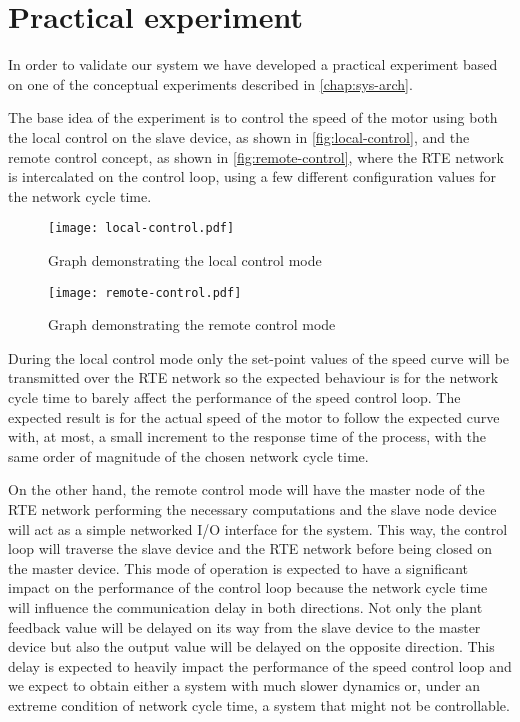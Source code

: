\section{Practical experiment}
In order to validate our system we have developed a practical experiment based on one of the conceptual experiments described in \autoref{chap:sys-arch}.

The base idea of the experiment is to control the speed of the motor using both the local control on the slave device, as shown in \autoref{fig:local-control}, and the remote control concept, as shown in \autoref{fig:remote-control}, where the RTE network is intercalated on the control loop, using a few different configuration values for the network cycle time.

\begin{figure}[htp]
	\centering
	\texttt{[image: local-control.pdf]}
	\caption{Graph demonstrating the local control mode}
	\label{fig:local-control}
\end{figure}

\begin{figure}[htp]
	\centering
	\texttt{[image: remote-control.pdf]}
	\caption{Graph demonstrating the remote control mode}
	\label{fig:remote-control}
\end{figure}

During the local control mode only the set-point values of the speed curve will be transmitted over the RTE network so the expected behaviour is for the network cycle time to barely affect the performance of the speed control loop.
The expected result is for the actual speed of the motor to follow the expected curve with, at most, a small increment to the response time of the process, with the same order of magnitude of the chosen network cycle time.

On the other hand, the remote control mode will have the master node of the RTE network performing the necessary computations and the slave node device will act as a simple networked I/O interface for the system.
This way, the control loop will traverse the slave device and the RTE network before being closed on the master device.
This mode of operation is expected to have a significant impact on the performance of the control loop because the network cycle time will influence the communication delay in both directions.
Not only the plant feedback value will be delayed on its way from the slave device to the master device but also the output value will be delayed on the opposite direction.
This delay is expected to heavily impact the performance of the speed control loop and we expect to obtain either a system with much slower dynamics or, under an extreme condition of network cycle time, a system that might not be controllable.

